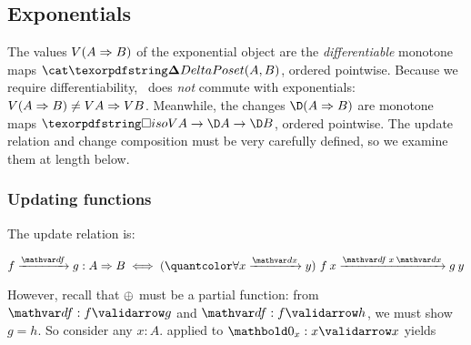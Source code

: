 



\subsection{Exponentials}
\label{sec:CP-exponentials}

The values $V{(A \Rightarrow B)}$ of the exponential object are the
\emph{differentiable} monotone maps $\CP(A, B)$, ordered pointwise. Because we
require differentiability, \valfn\ does \emph{not} commute with exponentials:
$V{(A \Rightarrow B)} \ne V A \Rightarrow V B$.
%
Meanwhile, the changes $\chgs{(\expO A B)}$ are monotone maps $\iso{\vals A}
\to \chgs A \to \chgs B$, ordered pointwise. The update relation and change
composition must be very carefully defined, so we examine them at length below.

\subsubsection{Updating functions}

The update relation is:

\nopagebreak[2]
\begin{equation}\label{eqn:function-update}
  \vld{\df}{f}{g} : \expO A B
  \iff \fa{\vld\dx x y} \vld{\df\<x\<\dx} {f\<x} {g\<y}
\end{equation}

\noindent However, recall that $\mathbin{\oplus}$ must be a partial function: from
$\valid\df f g$ and $\valid\df f h$, we must show $g = h$. So consider any $x :
A$.  applied to $\valid{\zero_x} x x$ yields

